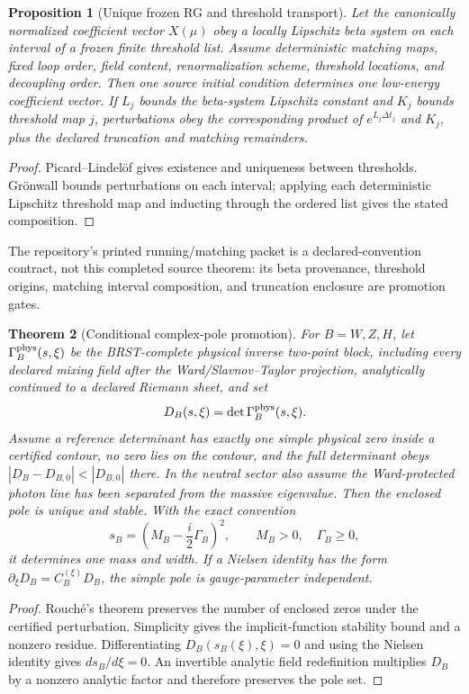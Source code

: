 \documentclass[11pt]{article}
\newtheorem{theorem}{Theorem}[section]
\newtheorem{proposition}[theorem]{Proposition}
\begin{document}
\begin{proposition}[Unique frozen RG and threshold transport]
Let the canonically normalized coefficient vector \(X(\mu)\) obey a locally
Lipschitz beta system on each interval of a frozen finite threshold list.
Assume deterministic matching maps, fixed loop order, field content,
renormalization scheme, threshold locations, and decoupling order.  Then one
source initial condition determines one low-energy coefficient vector.  If
\(L_j\) bounds the beta-system Lipschitz constant and \(K_j\) bounds threshold
map \(j\), perturbations obey the corresponding product of
\(e^{L_j\Delta t_j}\) and \(K_j\), plus the declared truncation and matching
remainders.
\end{proposition}

\begin{proof}
Picard--Lindel\"of gives existence and uniqueness between thresholds.
Gr\"onwall bounds perturbations on each interval; applying each deterministic
Lipschitz threshold map and inducting through the ordered list gives the
stated composition.
\end{proof}

The repository's printed running/matching packet is a declared-convention
contract, not this completed source theorem: its beta provenance, threshold
origins, matching interval composition, and truncation enclosure are
promotion gates.

\begin{theorem}[Conditional complex-pole promotion]
For \(B=W,Z,H\), let \(\Gamma_B^{\rm phys}(s,\xi)\) be the BRST-complete
physical inverse two-point block, including every declared mixing field after
the Ward/Slavnov--Taylor projection, analytically continued to a declared
Riemann sheet, and set
\[
D_B(s,\xi)=\det\Gamma_B^{\rm phys}(s,\xi).
\]
Assume a reference determinant has exactly one simple physical zero inside a
certified contour, no zero lies on the contour, and the full determinant obeys
\(|D_B-D_{B,0}|<|D_{B,0}|\) there.  In the neutral sector also assume the
Ward-protected photon line has been separated from the massive eigenvalue.
Then the enclosed pole is unique and stable.  With the exact convention
\[
s_B=\left(M_B-\frac{i}{2}\Gamma_B\right)^2,
\qquad M_B>0,\quad\Gamma_B\ge0,
\]
it determines one mass and width.  If a Nielsen identity has the form
\(\partial_\xi D_B=C_B^{(\xi)}D_B\), the simple pole is gauge-parameter independent.
\end{theorem}

\begin{proof}
Rouch\'e's theorem preserves the number of enclosed zeros under the certified
perturbation.  Simplicity gives the implicit-function stability bound and a
nonzero residue.  Differentiating \(D_B(s_B(\xi),\xi)=0\) and using the Nielsen
identity gives \(ds_B/d\xi=0\).  An invertible analytic field redefinition
multiplies \(D_B\) by a nonzero analytic factor and therefore preserves the
pole set.
\end{proof}
\end{document}
